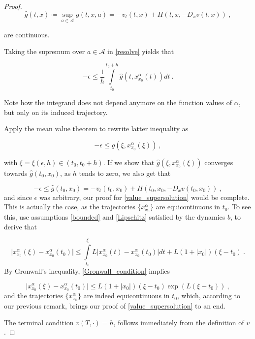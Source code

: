 \begin{theorem}
\begin{proof}
		\begin{equation*}
			\hat{g}(t, x) \coloneqq \sup\limits_{a \in \mathcal{A}} g(t, x, a) = -v_t(t, x) + H(t, x, -D_x v(t, x)) \ ,
		\end{equation*}
		
		are continuous.
		
		Taking the supremum over $ a \in \mathcal{A} $ in \eqref{resolve} yields that
		
		\begin{equation*}
			- \epsilon \leq \frac{1}{h} \int\limits^{t_0 + h}_{t_0} \hat{g}(t, x^{\alpha}_{x_0}(t)) dt \ .
		\end{equation*}
		
		Note how the integrand does not depend anymore on the function values of $ \alpha $, but only on its induced trajectory.
		
		Apply the mean value theorem to rewrite latter inequality as
		
		\begin{equation*}
			- \epsilon \leq \hat{g}(\xi, x^{\alpha}_{x_0}(\xi)) \ ,
		\end{equation*}
		
		with $ \xi = \xi(\epsilon, h) \in \left( t_0, t_0 + h \right) $. If we show that $ \hat{g}(\xi, x^{\alpha}_{x_0}(\xi)) $ converges towards $ \hat{g}(t_0, x_0) $, as $ h $ tends to zero, we also get that
		
		\begin{equation*}
			-\epsilon \leq \hat{g}(t_0, x_0) = -v_t(t_0, x_0) + H(t_0, x_0, -D_x v(t_0, x_0)) \ ,
		\end{equation*}
		and since $ \epsilon $ was arbitrary, our proof for \eqref{value_supersolution} would be complete. This is actually the case, as the trajectories $ \{ x^{\alpha}_{x_0} \} $ are equicontinuous in $ t_0 $. To see this, use assumptions \eqref{bounded} and \eqref{Lipschitz} satisfied by the dynamics $ b $, to derive that
		
		\begin{equation}
			\label{Gronwall_condition}
			\lvert x^{\alpha}_{x_0} (\xi) - x^{\alpha}_{x_0} (t_0) \rvert \leq \int\limits^{\xi}_{t_0} L \lvert x^{\alpha}_{x_0} (t) - x^{\alpha}_{x_0} (t_0) \rvert dt + L(1 + \lvert x_0 \rvert)(\xi - t_0) \ .
		\end{equation}
		By Gronwall's inequality, \eqref{Gronwall_condition} implies
		
		\begin{equation}
		\label{trajectory equicontinuous}
				\lvert x^{\alpha}_{x_0} (\xi) - x^{\alpha}_{x_0} (t_0) \rvert \leq L(1 + \lvert x_0 \rvert)(\xi - t_0) \exp(L(\xi - t_0)) \ ,
		\end{equation}
		and the trajectories $ \{ x^{\alpha}_{x_0} \} $ are indeed equicontinuous in $ t_0 $, which, according to our previous remark, brings our proof of \eqref{value_supersolution} to an end.
		
		The terminal condition $ v(T, \cdot) = h $, follows immediately from the definition of $ v $.
	\end{proof}
\end{theorem}